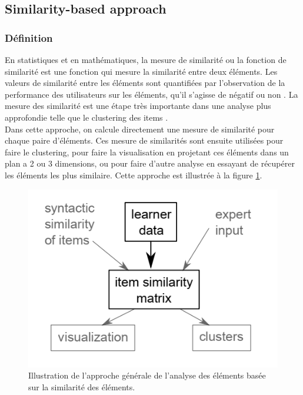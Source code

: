 \subsection{Similarity-based approach}
\subsubsection{Définition}
En statistiques et en mathématiques, la mesure de similarité ou la fonction de similarité est une fonction qui mesure la similarité entre deux éléments. Les valeurs de similarité entre les éléments sont quantifiées par l'observation de la performance des utilisateurs sur les éléments, qu'il s'agisse de négatif ou non \cite{nithya2017calculating}. La mesure des similarité est une étape très importante dans une analyse plus approfondie telle que le clustering des items \cite{pelanek2018measuring}.  \\
Dans cette approche, on calcule directement une mesure de similarité pour chaque paire d'éléments. Ces mesure de similarités sont ensuite utilisées pour faire le clustering, pour faire la visualisation en projetant ces éléments dans un plan a 2 ou 3 dimensions, ou pour faire d’autre analyse en essayant de récupérer les éléments les plus similaire. Cette approche est illustrée à la figure \ref{illustration_item_similarity}. 

\begin{figure}[H]
	\begin{center}
		\includegraphics[scale=1]{images/chapitre3/Illustration_item_smilarity.png}
	\end{center}
\caption{Illustration de l'approche générale de l'analyse des éléments basée sur la similarité des éléments.}
\label{illustration_item_similarity}
\end{figure}

